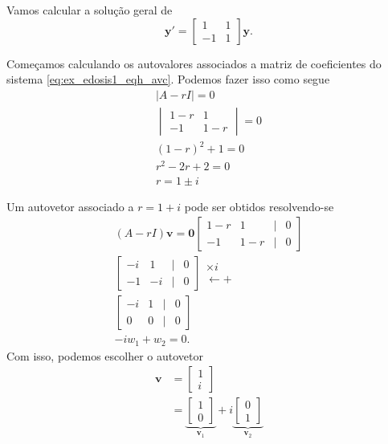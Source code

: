 \begin{ex}
  Vamos calcular a solução geral de
  \begin{equation}\label{eq:ex_edosis1_eqh_avc}
    \pmb{y}' =
    \begin{bmatrix}
      1 & 1 \\
      -1 & 1
    \end{bmatrix}\pmb{y}.
  \end{equation}

  Começamos calculando os autovalores associados a matriz de coeficientes do sistema \eqref{eq:ex_edosis1_eqh_avc}. Podemos fazer isso como segue
  \begin{gather}
    |A-rI| = 0 \\
    \begin{vmatrix}
      1-r & 1 \\
      -1 & 1-r
    \end{vmatrix} = 0 \\
    (1-r)^2 + 1 = 0 \\
    r^2 - 2r + 2 = 0 \\
    r = 1\pm i
  \end{gather}

  Um autovetor associado a $r = 1 + i$ pode ser obtidos resolvendo-se
  \begin{gather}
    (A-rI)\pmb{v} = \pmb{0}
    \begin{bmatrix}
      1-r & 1 & | & 0 \\
      -1 & 1-r & | & 0
    \end{bmatrix} \\
    \begin{bmatrix}
      -i &  1 & | & 0 \\
      -1 & -i & | & 0
    \end{bmatrix}
    \begin{matrix}
      \times i \\
      \leftarrow +
    \end{matrix}\\
    \begin{bmatrix}
      -i & 1 & | & 0 \\
      0 & 0 & | & 0
    \end{bmatrix} \\
    -iw_1 + w_2 = 0.
  \end{gather}
  Com isso, podemos escolher o autovetor
  \begin{align}
    \pmb{v} &=
              \begin{bmatrix}
                1 \\
                i
              \end{bmatrix} \\
            &=
              \underbrace{\begin{bmatrix}
                1\\
                0
              \end{bmatrix}}_{\pmb{v}_1} + i
    \underbrace{\begin{bmatrix}
      0\\
      1
    \end{bmatrix}}_{\pmb{v}_2}
  \end{align}
  

\end{ex}
